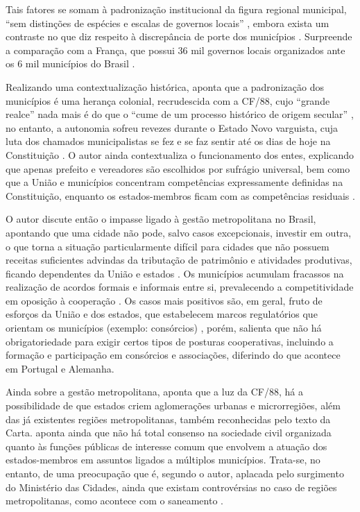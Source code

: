 \documentclass[
article,			%
11pt,				%
oneside,			%
a4paper,			%
english,			%
brazil,				%
sumario=tradicional
]{abntex2}
\begin{document}
	Tais fatores se somam à padronização institucional da figura regional municipal, ``sem distinções de espécies e escalas de governos locais'' \cite[p. 52]{machado2009}, embora exista um contraste no que diz respeito à discrepância de porte dos municípios \cite[p. 53]{machado2009}. Surpreende a comparação com a França, que possui 36 mil governos locais organizados ante os 6 mil municípios do Brasil \cite[p. 53]{machado2009}.
	
	Realizando uma contextualização histórica,  aponta que a padronização dos municípios é uma herança colonial, recrudescida com a CF/88, cujo ``grande realce'' nada mais é do que o ``cume de um processo histórico de origem secular'' \cite[p. 55]{machado2009}, no entanto, a autonomia sofreu revezes durante o Estado Novo varguista, cuja luta dos chamados municipalistas se fez e se faz sentir até os dias de hoje na Constituição \cite[p. 55]{machado2009}. O autor ainda contextualiza o funcionamento dos entes, explicando que apenas prefeito e vereadores são escolhidos por sufrágio universal, bem como que a União e municípios concentram competências expressamente definidas na Constituição, enquanto os estados-membros ficam com as competências residuais \cite[p. 56-57]{machado2009}.
	
	O autor discute então o impasse ligado à gestão metropolitana no Brasil, apontando que uma cidade não pode, salvo casos excepcionais, investir em outra, o que torna a situação particularmente difícil para cidades que não possuem receitas suficientes advindas da tributação de patrimônio e atividades produtivas, ficando dependentes da União e estados \cite[p. 57]{machado2009}. Os municípios acumulam fracassos na realização de acordos formais e informais entre si, prevalecendo a competitividade em oposição à cooperação \cite[p. 57]{machado2009}. Os casos mais positivos são, em geral, fruto de esforços da União e dos estados, que estabelecem marcos regulatórios que orientam os municípios (exemplo: consórcios) \cite[p. 58]{machado2009}, porém,  salienta que não há obrigatoriedade para exigir certos tipos de posturas cooperativas, incluindo a formação e participação em consórcios e associações, diferindo do que acontece em Portugal e Alemanha.
	
	Ainda sobre a gestão metropolitana,  aponta que a luz da CF/88, há a possibilidade de que estados criem aglomerações urbanas e microrregiões, além das já existentes regiões metropolitanas, também reconhecidas pelo texto da Carta.  aponta ainda que não há total consenso na sociedade civil organizada quanto às funções públicas de interesse comum que envolvem a atuação dos estados-membros em assuntos ligados a múltiplos municípios. Trata-se, no entanto, de uma preocupação que é, segundo o autor, aplacada pelo surgimento do Ministério das Cidades, ainda que existam controvérsias no caso de regiões metropolitanas, como acontece com o saneamento \cite[p. 60--61]{machado2009}.
	
\end{document}
